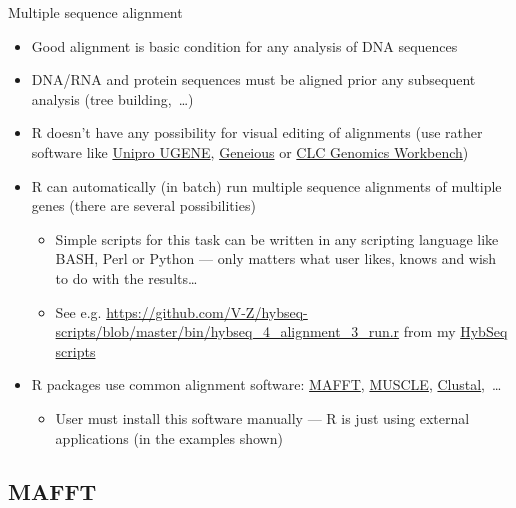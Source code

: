\documentclass[compress, xelatex, 11pt, xcolor=svgnames, aspectratio=169,
	hyperref={
		bookmarks=true,
		unicode=true,
		colorlinks=true,
		pdftitle={Molecular data in R},
		plainpages=false,
		pdfauthor={Vojtech Zeisek},
		pdfsubject={Course about phylogeny and evolution in R},
		pdfcreator={XeLaTeX},
		pdfkeywords={R, evolution, phylogeny, molecular data},
		linkcolor=Crimson, %
		anchorcolor=Magenta, %
		citecolor=Magenta, %
		filecolor=Magenta, %
		menucolor=Magenta, %
		urlcolor=DodgerBlue, %
		},
	url={hyphens, lowtilde} %
	]{beamer}
\begin{document}
\begin{frame}{Multiple sequence alignment}
	\label{alignment}
	\begin{itemize}
		\item Good alignment is basic condition for any analysis of DNA sequences
		\item DNA/RNA and protein sequences must be aligned prior any subsequent analysis (tree building,~\ldots)
		\item R doesn't have any possibility for visual editing of alignments (use rather software like \href{https://ugene.net/}{Unipro UGENE}, \href{https://www.geneious.com/}{Geneious} or \href{https://digitalinsights.qiagen.com/products-overview/analysis-and-visualization/qiagen-clc-genomics-workbench/}{CLC Genomics Workbench})
		\item R can automatically (in batch) run multiple sequence alignments of multiple genes (there are several possibilities)
		\begin{itemize}
			\item Simple scripts for this task can be written in any scripting language like BASH, Perl or Python --- only matters what user likes, knows and wish to do with the results\ldots
			\item See e.g. \url{https://github.com/V-Z/hybseq-scripts/blob/master/bin/hybseq_4_alignment_3_run.r} from my \href{https://github.com/V-Z/hybseq-scripts}{HybSeq scripts}
		\end{itemize}
		\item R packages use common alignment software: \href{https://mafft.cbrc.jp/alignment/software/}{MAFFT}, \href{https://www.drive5.com/muscle/}{MUSCLE}, \href{http://clustal.org/}{Clustal},~\ldots
		\begin{itemize}
			\item User must install this software manually --- R is just using external applications (in the examples shown)
		\end{itemize}
	\end{itemize}
\end{frame}

\subsection{MAFFT}
\end{document}
